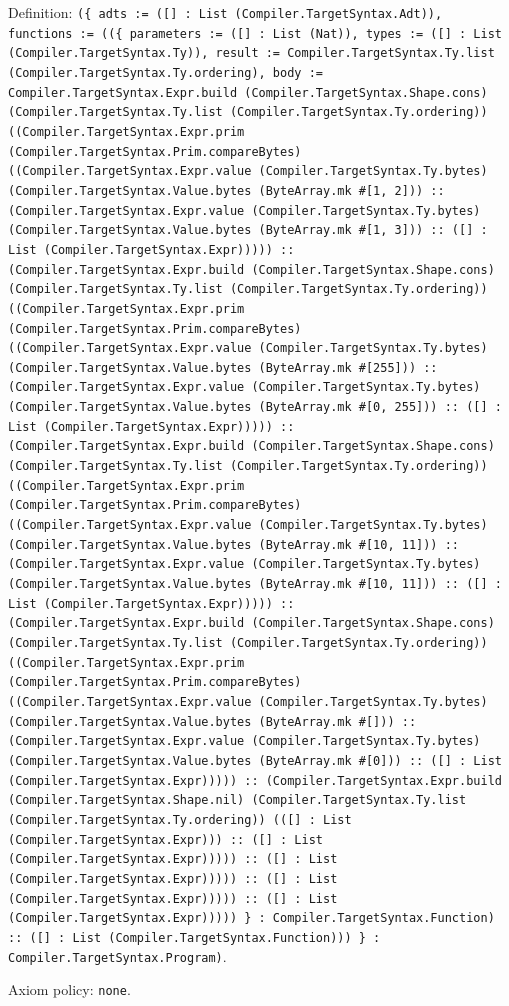\documentclass[11pt]{article}
\begin{document}
\noindent Definition: \texttt{(\{ adts := ([] : List (Compiler.TargetSyntax.Adt)), functions := ((\{ parameters := ([] : List (Nat)), types := ([] : List (Compiler.TargetSyntax.Ty)), result := Compiler.TargetSyntax.Ty.list (Compiler.TargetSyntax.Ty.ordering), body := Compiler.TargetSyntax.Expr.build (Compiler.TargetSyntax.Shape.cons) (Compiler.TargetSyntax.Ty.list (Compiler.TargetSyntax.Ty.ordering)) ((Compiler.TargetSyntax.Expr.prim (Compiler.TargetSyntax.Prim.compareBytes) ((Compiler.TargetSyntax.Expr.value (Compiler.TargetSyntax.Ty.bytes) (Compiler.TargetSyntax.Value.bytes (ByteArray.mk \#[1, 2])) :: (Compiler.TargetSyntax.Expr.value (Compiler.TargetSyntax.Ty.bytes) (Compiler.TargetSyntax.Value.bytes (ByteArray.mk \#[1, 3])) :: ([] : List (Compiler.TargetSyntax.Expr))))) :: (Compiler.TargetSyntax.Expr.build (Compiler.TargetSyntax.Shape.cons) (Compiler.TargetSyntax.Ty.list (Compiler.TargetSyntax.Ty.ordering)) ((Compiler.TargetSyntax.Expr.prim (Compiler.TargetSyntax.Prim.compareBytes) ((Compiler.TargetSyntax.Expr.value (Compiler.TargetSyntax.Ty.bytes) (Compiler.TargetSyntax.Value.bytes (ByteArray.mk \#[255])) :: (Compiler.TargetSyntax.Expr.value (Compiler.TargetSyntax.Ty.bytes) (Compiler.TargetSyntax.Value.bytes (ByteArray.mk \#[0, 255])) :: ([] : List (Compiler.TargetSyntax.Expr))))) :: (Compiler.TargetSyntax.Expr.build (Compiler.TargetSyntax.Shape.cons) (Compiler.TargetSyntax.Ty.list (Compiler.TargetSyntax.Ty.ordering)) ((Compiler.TargetSyntax.Expr.prim (Compiler.TargetSyntax.Prim.compareBytes) ((Compiler.TargetSyntax.Expr.value (Compiler.TargetSyntax.Ty.bytes) (Compiler.TargetSyntax.Value.bytes (ByteArray.mk \#[10, 11])) :: (Compiler.TargetSyntax.Expr.value (Compiler.TargetSyntax.Ty.bytes) (Compiler.TargetSyntax.Value.bytes (ByteArray.mk \#[10, 11])) :: ([] : List (Compiler.TargetSyntax.Expr))))) :: (Compiler.TargetSyntax.Expr.build (Compiler.TargetSyntax.Shape.cons) (Compiler.TargetSyntax.Ty.list (Compiler.TargetSyntax.Ty.ordering)) ((Compiler.TargetSyntax.Expr.prim (Compiler.TargetSyntax.Prim.compareBytes) ((Compiler.TargetSyntax.Expr.value (Compiler.TargetSyntax.Ty.bytes) (Compiler.TargetSyntax.Value.bytes (ByteArray.mk \#[])) :: (Compiler.TargetSyntax.Expr.value (Compiler.TargetSyntax.Ty.bytes) (Compiler.TargetSyntax.Value.bytes (ByteArray.mk \#[0])) :: ([] : List (Compiler.TargetSyntax.Expr))))) :: (Compiler.TargetSyntax.Expr.build (Compiler.TargetSyntax.Shape.nil) (Compiler.TargetSyntax.Ty.list (Compiler.TargetSyntax.Ty.ordering)) (([] : List (Compiler.TargetSyntax.Expr))) :: ([] : List (Compiler.TargetSyntax.Expr))))) :: ([] : List (Compiler.TargetSyntax.Expr))))) :: ([] : List (Compiler.TargetSyntax.Expr))))) :: ([] : List (Compiler.TargetSyntax.Expr))))) \} : Compiler.TargetSyntax.Function) :: ([] : List (Compiler.TargetSyntax.Function))) \} : Compiler.TargetSyntax.Program)}.\par
\noindent Axiom policy: \texttt{none}.\par
\end{document}
